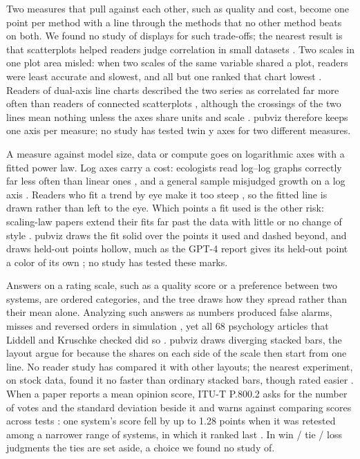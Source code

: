 \documentclass[11pt]{article}
\begin{document}
Two measures that pull against each other, such as quality and cost, become
one point per method with a line through the methods that no other method
beats on both. We found no study of displays for such trade-offs; the nearest
result is that scatterplots helped readers judge correlation in small
datasets \citep[Table~1]{saket2019task}. Two scales in one plot area misled:
when two scales of the same variable shared a plot, readers were least
accurate and slowest, and all but one ranked that chart lowest
\citep[Secs.~5--6]{isenberg2011study}. Readers of dual-axis line charts
described the two series as correlated far more often than readers of
connected scatterplots \citep[Sec.~3.3]{haroz2016connected}, although the
crossings of the two lines mean nothing unless the axes share units and
scale \citep[Sec.~2.2]{haroz2016connected}. pubviz therefore keeps one axis
per measure; no study has tested twin y axes for two different measures.

A measure against model size, data or compute goes on logarithmic axes with
a fitted power law. Log axes carry a cost: ecologists read log--log graphs
correctly far less often than linear ones \citep[abstract]{menge2018logarithmic},
and a general sample misjudged growth on a log axis
\citep[Table~7]{romano2020scale}. Readers who fit a trend by eye make it too
steep \citep[Sec.~3.2.2]{ciccione2021can}, so the fitted line is drawn rather
than left to the eye. Which points a fit used is the other risk: scaling-law
papers extend their fits far past the data with little or no change of style
\citep[Fig.~15]{kaplan2020scaling}\citep[Figs.~1--3]{hoffmann2022training}.
pubviz draws the fit solid over the points it used and dashed beyond, and
draws held-out points hollow, much as the GPT-4 report gives its held-out
point a color of its own \citep[Fig.~1]{openai2023gpt4}; no study has tested
these marks.

Answers on a rating scale, such as a quality score or a preference between
two systems, are ordered categories, and the tree draws how they spread
rather than their mean alone. Analyzing such answers as numbers produced
false alarms, misses and reversed orders in simulation
\citep[Figs.~2--4]{liddell2018analyzing}, yet all 68 psychology articles that
Liddell and Kruschke checked did so \citep[pp.~4--5]{liddell2018analyzing}.
pubviz draws diverging stacked bars, the layout
\citet[p.~6]{heiberger2014design} argue for because the shares on each side
of the scale then start from one line. No reader study has compared it with
other layouts; the nearest experiment, on stock data, found it no faster than
ordinary stacked bars, though rated easier \citep[Secs.~5.1, 5.3]{indratmo2018efficacy}.
When a paper reports a mean opinion score, ITU-T P.800.2 asks for the number
of votes and the standard deviation beside it and warns against comparing
scores across tests \citep[cls.~8, 10]{itu2016p8002}: one system's score fell
by up to 1.28 points when it was retested among a narrower range of systems,
in which it ranked last \citep[Sec.~4.4]{cooper2023investigating}. In win / tie / loss judgments the
ties are set aside, a choice we found no study of.
\end{document}
